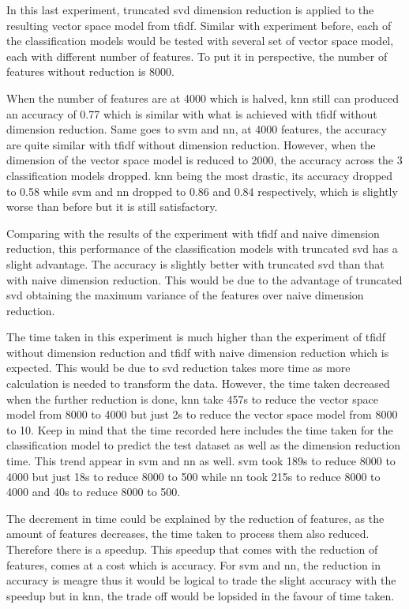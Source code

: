 In this last experiment, truncated \ac{svd} dimension reduction is applied to the resulting vector space model from \ac{tfidf}. Similar with experiment before, each of the classification models would be tested with several set of vector space model, each with different number of features. To put it in perspective, the number of features without reduction is 8000. 

When the number of features are at 4000 which is halved, \ac{knn} still can produced an accuracy of 0.77 which is similar with what is achieved with \ac{tfidf} without dimension reduction. Same goes to \ac{svm} and \ac{nn}, at 4000 features, the accuracy are quite similar with \ac{tfidf} without dimension reduction. However, when the dimension of the vector space model is reduced to 2000, the accuracy across the 3 classification models dropped. \Ac{knn} being the most drastic, its accuracy dropped to 0.58 while \ac{svm} and \ac{nn} dropped to 0.86 and 0.84 respectively, which is slightly worse than before but it is still satisfactory.

Comparing with the results of the experiment with \ac{tfidf} and naive dimension reduction, this performance of the classification models with truncated \ac{svd} has a slight advantage. The accuracy is slightly better with truncated \ac{svd} than that with naive dimension reduction. This would be due to the advantage of truncated \ac{svd} obtaining the maximum variance of the features over naive dimension reduction.

The time taken in this experiment is much higher than the experiment of \ac{tfidf} without dimension reduction and \ac{tfidf} with naive dimension reduction which is expected. This would be due to \ac{svd} reduction takes more time as more calculation is needed to transform the data. However, the time taken decreased when the further reduction is done, \ac{knn} take 457s to reduce the vector space model from 8000 to 4000 but just 2s to reduce the vector space model from 8000 to 10. Keep in mind that the time recorded here includes the time taken for the classification model to predict the test dataset as well as the dimension reduction time. This trend appear in \ac{svm} and \ac{nn} as well. \Ac{svm} took 189s to reduce 8000 to 4000 but just 18s to reduce 8000 to 500 while \ac{nn} took 215s to reduce 8000 to 4000 and 40s to reduce 8000 to 500. 

The decrement in time could be explained by the reduction of features, as the amount of features decreases, the time taken to process them also reduced. Therefore there is a speedup. This speedup that comes with the reduction of features, comes at a cost which is accuracy. For \ac{svm} and \ac{nn}, the reduction in accuracy is meagre thus it would be logical to trade the slight accuracy with the speedup but in \ac{knn}, the trade off would be lopsided in the favour of time taken.\\


